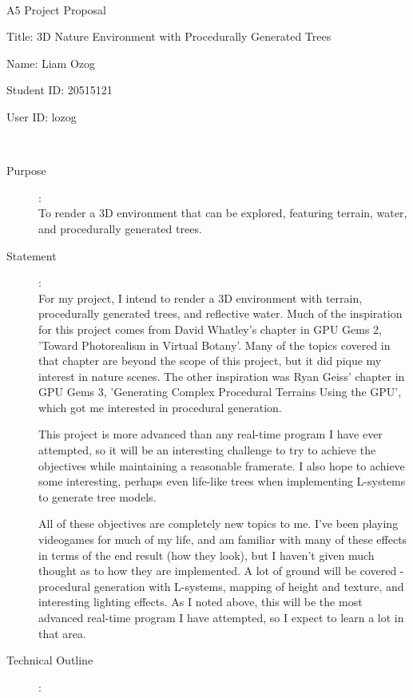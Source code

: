 \documentclass {article}
\begin{document}
~\vfill
\begin{center}
\Large

A5 Project Proposal

Title: 3D Nature Environment with Procedurally Generated Trees

Name: Liam Ozog

Student ID: 20515121

User ID: lozog
\end{center}
\vfill ~\vfill~
\newpage
{}
\begin{description}
\item[Purpose]:\\
	To render a 3D environment that can be explored, featuring terrain, water, and procedurally generated trees.

\item[Statement]:\\

	For my project, I intend to render a 3D environment with terrain, procedurally generated trees, and reflective water. Much of the inspiration for this project comes from David Whatley's chapter in GPU Gems 2, 'Toward Photorealism in Virtual Botany'. Many of the topics covered in that chapter are beyond the scope of this project, but it did pique my interest in nature scenes. The other inspiration was Ryan Geiss' chapter in GPU Gems 3, 'Generating Complex Procedural Terrains Using the GPU', which got me interested in procedural generation.

	This project is more advanced than any real-time program I have ever attempted, so it will be an interesting challenge to try to achieve the objectives while maintaining a reasonable framerate. I also hope to achieve some interesting, perhaps even life-like trees when implementing L-systems to generate tree models.

	All of these objectives are completely new topics to me. I've been playing videogames for much of my life, and am familiar with many of these effects in terms of the end result (how they look), but I haven't given much thought as to how they are implemented. A lot of ground will be covered - procedural generation with L-systems, mapping of height and texture, and interesting lighting effects. As I noted above, this will be the most advanced real-time program I have attempted, so I expect to learn a lot in that area.

\item[Technical Outline]:\\


\end{description}
\end{document}
